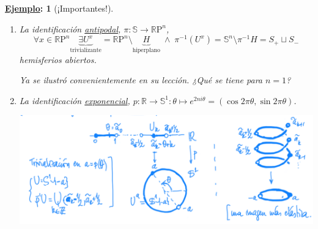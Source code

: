 \documentclass[10pt,a4paper,openright]{book}
\theoremstyle{break}
\newtheorem*{ej}{\underline{Ejemplo}:}
\begin{document}
\begin{ej}[¡Importantes!]
\begin{enumerate}
    \item La identificación \underline{antipodal}, $\pi: \mathbb{S} \rightarrow \mathbb{R}\mathrm{P}^n$,
    \[
    \forall x \in \mathbb{R}\mathrm{P}^n \underbrace{\exists U^x}_{\text{trivializante}} = \mathbb{R}\mathrm{P}^n \setminus \underbrace{H}_{\text{hiperplano}}\; \land \;\pi^{-1}\left( U^x \right) = \mathbb{S}^n\setminus \pi^{-1}H = S_+ \sqcup S_-  
    \]
    hemisferios abiertos.

    Ya se ilustró convenientemente en su lección. ¿Qué se tiene para $n = 1$?

    \item La identificación \underline{exponencial}, $p: \mathbb{R} \rightarrow \mathbb{S}^1: \theta \mapsto e^{2ni\theta} = \left( \cos 2\pi\theta, \sin 2\pi\theta \right)$.
    \begin{center}
        \includegraphics[scale=0.2]{images/identificacion_exponencial} 
    \end{center}
\end{enumerate} 
\end{ej}
\end{document}
